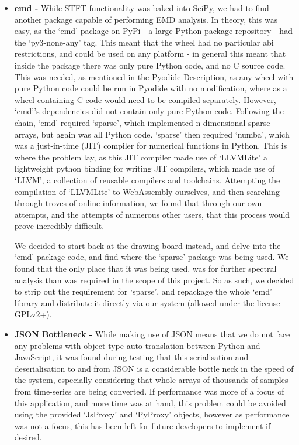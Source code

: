 \begin{itemize}
    \item {\bf emd - } While STFT functionality was baked into SciPy, we had to find another package capable of performing EMD analysis. In theory, this was easy, as the `emd' package on PyPi - a large Python package repository - 
    had the `py3-none-any' tag. This meant that the wheel had no particular abi restrictions, and could be used on any platform - in general this meant that inside the package there was only pure Python code, and no C source code.
    This was needed, as mentioned in the \hyperref[pyodide]{Pyodide Description}, as any wheel with pure Python code could be run in Pyodide with no modification, where as a wheel containing C code would need to be compiled separately.
    However, `emd''s dependencies did not contain only pure Python code. Following the chain, `emd' required `sparse', which implemented n-dimensional sparse arrays, but again was all Python code. `sparse' then required `numba', which was a 
    just-in-time (JIT) compiler for numerical functions in Python. This is where the problem lay, as this JIT compiler made use of `LLVMLite' a lightweight python binding for writing JIT compilers, 
    which made use of `LLVM', a collection of reusable compilers and toolchains. Attempting the compilation of `LLVMLite' to WebAssembly ourselves, and then searching through troves of online information, we found that through our own
    attempts, and the attempts of numerous other users, that this process would prove incredibly difficult.

    We decided to start back at the drawing board instead, and delve into the `emd' package code, and find where the `sparse' package was being used. We found that the only place that it was being used, was for further spectral
    analysis than was required in the scope of this project. So as such, we decided to strip out the requirement for `sparse', and repackage the whole `emd' library and distribute it directly via our
    system (allowed under the license GPLv2+).


    \item {\bf JSON Bottleneck - } While making use of JSON means that we do not face any problems with object type auto-translation between Python and JavaScript, it was found during testing that this serialisation and deserialisation
    to and from JSON is a considerable bottle neck in the speed of the system, especially considering that whole arrays of thousands of samples from time-series are being converted. If performance was more of a focus of this application,
    and more time was at hand, this problem could be avoided using the provided `JsProxy' and `PyProxy' objects, however as performance was not a focus, this has been left for future developers to implement if desired.


\end{itemize}
